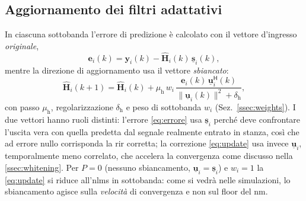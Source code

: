 \documentclass[11pt,a4paper]{article}
\begin{document}
	\subsection{Aggiornamento dei filtri adattativi}\label{ssec:filter_update}
	In ciascuna sottobanda l'errore di predizione è calcolato con il vettore d'ingresso \emph{originale},
	\begin{equation}
		\mathbf{e}_i(k) = \mathbf{y}_i(k) - \hat{\mathbf{H}}_i(k)\,\underline{\mathbf{s}}_i(k),
		\label{eq:errore}
	\end{equation}
	mentre la direzione di aggiornamento usa il vettore \emph{sbiancato}:
	\begin{equation}
		\hat{\mathbf{H}}_i(k+1) = \hat{\mathbf{H}}_i(k) + \mu_{\mathrm{h}}\, w_i\,
		\frac{\mathbf{e}_i(k)\,\underline{\mathbf{u}}_i^{\mathsf{H}}(k)}{\lVert\underline{\mathbf{u}}_i(k)\rVert^2 + \delta_{\mathrm{h}}},
		\label{eq:update}
	\end{equation}
	con passo $\mu_{\mathrm{h}}$, regolarizzazione $\delta_{\mathrm{h}}$ e peso di sottobanda $w_i$ (Sez.~\ref{ssec:weights}).
	I due vettori hanno ruoli distinti: l'errore \eqref{eq:errore} usa $\underline{\mathbf{s}}_i$ perché deve confrontare l'uscita vera con quella predetta dal segnale realmente entrato in stanza, così che ad errore nullo corrisponda la \ac{rir} corretta; la correzione \eqref{eq:update} usa invece $\underline{\mathbf{u}}_i$, temporalmente meno correlato, che accelera la convergenza come discusso nella \ref{ssec:whitening}.
	Per $P=0$ (nessuno sbiancamento, $\underline{\mathbf{u}}_i = \underline{\mathbf{s}}_i$) e $w_i = 1$ la \eqref{eq:update} si riduce all'\ac{nlms} in sottobanda: come si vedrà nelle simulazioni, lo sbiancamento agisce sulla \emph{velocità} di convergenza e non sul floor del \ac{nm}.
	
\end{document}
